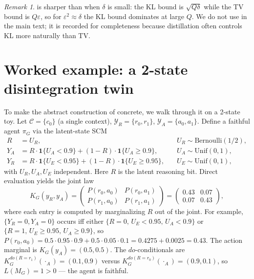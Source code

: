 \documentclass{article}
\theoremstyle{plain}
\theoremstyle{definition}
\theoremstyle{remark}
\newtheorem{remark}[theorem]{Remark}
\newcommand{\C}{\mathcal{C}}
\newcommand{\YR}{\mathcal{Y}_R}
\newcommand{\YA}{\mathcal{Y}_A}
\begin{document}
\begin{remark}
 is sharper than  when $\delta$ is small: the
KL bound is $\sqrt{Q\delta}$ while the TV bound is $Q\varepsilon$, so for
$\varepsilon^2 \approx \delta$ the KL bound dominates at large $Q$. We do not
use  in the main text; it is recorded for completeness because
distillation often controls KL more naturally than TV.
\end{remark}

\section{Worked example: a 2-state disintegration twin}\label{app:worked-example}

To make the abstract construction of  concrete,
we walk through it on a 2-state toy. Let $\C = \{c_0\}$ (a single context),
$\YR = \{r_0, r_1\}$, $\YA = \{a_0, a_1\}$. Define a faithful agent $\pi_G$
via the latent-state SCM
\begin{align*}
R   &= U_R, &\quad U_R \sim \mathrm{Bernoulli}(1/2), \\
Y_A &= R \cdot \mathbf{1}\{U_A < 0.9\} + (1 - R) \cdot \mathbf{1}\{U_A \ge 0.9\}, &\quad U_A \sim \mathrm{Unif}(0,1), \\
Y_R &= R \cdot \mathbf{1}\{U_E < 0.95\} + (1 - R) \cdot \mathbf{1}\{U_E \ge 0.95\}, &\quad U_E \sim \mathrm{Unif}(0,1),
\end{align*}
with $U_R, U_A, U_E$ independent. Here $R$ is the latent reasoning bit.
Direct evaluation yields the joint law
\[
K_G(y_R, y_A) = \begin{pmatrix}
P(r_0, a_0) & P(r_0, a_1) \\
P(r_1, a_0) & P(r_1, a_1)
\end{pmatrix}
= \begin{pmatrix}
0.43 & 0.07 \\
0.07 & 0.43
\end{pmatrix},
\]
where each entry is computed by marginalizing $R$ out of the joint.
For example, $\{Y_R = 0, Y_A = 0\}$ occurs iff either $\{R = 0,\,U_E < 0.95,\,U_A < 0.9\}$ or $\{R = 1,\,U_E \ge 0.95,\,U_A \ge 0.9\}$, so
$P(r_0, a_0) = 0.5 \cdot 0.95 \cdot 0.9 + 0.5 \cdot 0.05 \cdot 0.1 = 0.4275 + 0.0025 = 0.43$.
The action marginal is $K_G(y_A) = (0.5, 0.5)$. The $do$-conditionals are
$K_G^{do(R = r_1)}(\cdot_A) = (0.1, 0.9)$ versus
$K_G^{do(R = r_0)}(\cdot_A) = (0.9, 0.1)$, so
$L(M_G) = 1 > 0$ --- the agent is faithful.
\end{document}
